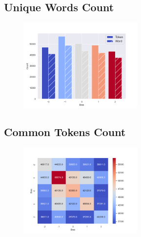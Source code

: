 \documentclass[11pt]{article}
\begin{document}
\subsection{Unique Words Count}
\begin{center}


\CountUWTable
\begin{figure}[h!]
  \includegraphics[width=0.55\textwidth]{figs/count_unique_words/count_tokens_words.png}
\end{figure}
\end{center}


\subsection{Common Tokens Count}
\begin{center}


\CountCTTable
\begin{figure}[h!]
  \includegraphics[width=0.55\textwidth]{figs/count_cuc_words/c_t.png}
\end{figure}
\end{center}
\end{document}
